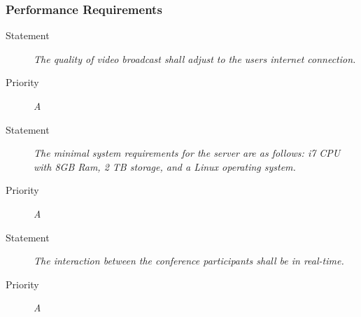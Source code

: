 \subsubsection{Performance Requirements}

\NFR
\begin{description}
\item[Statement] \textit{The quality of video broadcast shall adjust to the
    users internet connection.}
\item[Priority] \textit{A}
\end{description}

\NFR
\begin{description}
\item[Statement] \textit{The minimal system requirements for the server are as
    follows: i7 CPU with 8GB Ram, 2 TB storage, and a Linux operating
    system.}
\item[Priority] \textit{A}
\end{description}

\NFR
\begin{description}
\item[Statement] \textit{The interaction between the conference participants
    shall be in real-time.}
\item[Priority] \textit{A}
\end{description}